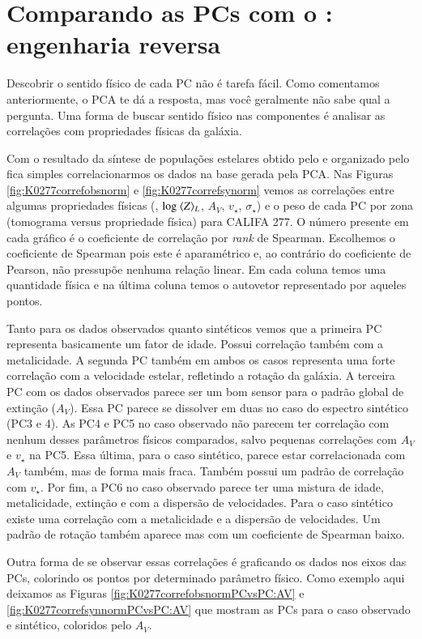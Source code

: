 \section{Comparando as PCs com o \STARLIGHT: engenharia reversa}
\label{sec:PCAaplic:EngRev}

Descobrir o sentido físico de cada PC não é tarefa fácil. Como comentamos anteriormente, o PCA te dá a resposta, mas
você geralmente não sabe qual a pergunta. Uma forma de buscar sentido físico nas componentes é analisar as correlações
com propriedades físicas da galáxia.

Com o resultado da síntese de populações estelares obtido pelo \starlight e organizado pelo \pycasso fica simples
correlacionarmos os dados na base gerada pela PCA. Nas Figuras \ref{fig:K0277correfobsnorm} e
\ref{fig:K0277correfsynorm} vemos as correlações entre algumas propriedades físicas (, $\log\ \meanL{Z}$,
$A_V$, $v_{\star}$, $\sigma_{\star}$) e o peso de cada PC por zona (tomograma versus propriedade física) para CALIFA
277. O número presente em cada gráfico é o coeficiente de correlação por {\em rank} de Spearman. Escolhemos o
coeficiente de Spearman pois este é aparamétrico e, ao contrário do coeficiente de Pearson, não pressupõe nenhuma
relação linear. Em cada coluna temos uma quantidade física e na última coluna temos o autovetor representado por aqueles
pontos.

Tanto para os dados observados quanto sintéticos vemos que a primeira PC representa basicamente um fator de idade.
Possui correlação também com a metalicidade. A segunda PC também em ambos os casos representa uma forte correlação com a
velocidade estelar, refletindo a rotação da galáxia. A terceira PC com os dados observados parece ser um bom sensor para
o padrão global de extinção ($A_V$). Essa PC parece se dissolver em duas no caso do espectro sintético (PC3 e 4). As PC4
e PC5 no caso observado não parecem ter correlação com nenhum desses parâmetros físicos comparados, salvo pequenas
correlações com $A_V$ e $v_\star$ na PC5. Essa última, para o caso sintético, parece estar correlacionada com $A_V$
também, mas de forma mais fraca. Também possui um padrão de correlação com $v_\star$. Por fim, a PC6 no caso observado
parece ter uma mistura de idade, metalicidade, extinção e com a dispersão de velocidades. Para o caso sintético existe
uma correlação com a metalicidade e a dispersão de velocidades. Um padrão de rotação também aparece mas com um
coeficiente de Spearman baixo.

Outra forma de se observar essas correlações é graficando os dados nos eixos das PCs, colorindo os pontos por
determinado parâmetro físico. Como exemplo aqui deixamos as Figuras \ref{fig:K0277correfobsnormPCvsPC:AV} e
\ref{fig:K0277correfsynnormPCvsPC:AV} que mostram as PCs para o caso observado e sintético, coloridos pelo $A_V$.

